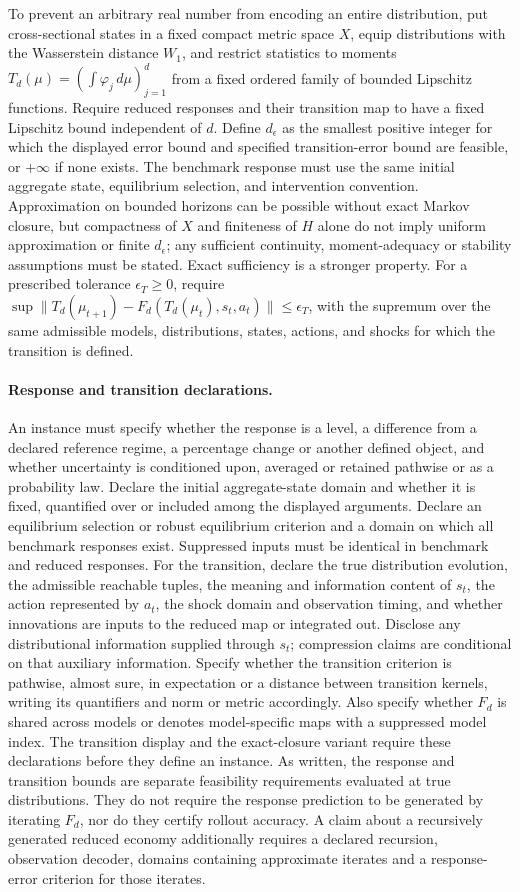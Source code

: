 \documentclass[11pt,a4paper]{article}
\begin{document}
To prevent an arbitrary real number from encoding an entire distribution, put cross-sectional states in a fixed compact metric space \(X\), equip distributions with the Wasserstein distance \(W_1\), and restrict statistics to moments \(T_d(\mu)=(\int\varphi_j\,d\mu)_{j=1}^d\) from a fixed ordered family of bounded Lipschitz functions. Require reduced responses and their transition map to have a fixed Lipschitz bound independent of \(d\). Define \(d_\epsilon\) as the smallest positive integer for which the displayed error bound and specified transition-error bound are feasible, or \(+\infty\) if none exists. The benchmark response must use the same initial aggregate state, equilibrium selection, and intervention convention. Approximation on bounded horizons can be possible without exact Markov closure, but compactness of \(X\) and finiteness of \(H\) alone do not imply uniform approximation or finite \(d_\epsilon\); any sufficient continuity, moment-adequacy or stability assumptions must be stated. Exact sufficiency is a stronger property. For a prescribed tolerance \(\epsilon_T\ge0\), require \(\sup\|T_d(\mu_{t+1})-F_d(T_d(\mu_t),s_t,a_t)\|\le\epsilon_T\), with the supremum over the same admissible models, distributions, states, actions, and shocks for which the transition is defined.
\paragraph{Response and transition declarations.} An instance must specify whether the response is a level, a difference from a declared reference regime, a percentage change or another defined object, and whether uncertainty is conditioned upon, averaged or retained pathwise or as a probability law. Declare the initial aggregate-state domain and whether it is fixed, quantified over or included among the displayed arguments. Declare an equilibrium selection or robust equilibrium criterion and a domain on which all benchmark responses exist. Suppressed inputs must be identical in benchmark and reduced responses. For the transition, declare the true distribution evolution, the admissible reachable tuples, the meaning and information content of \(s_t\), the action represented by \(a_t\), the shock domain and observation timing, and whether innovations are inputs to the reduced map or integrated out. Disclose any distributional information supplied through \(s_t\); compression claims are conditional on that auxiliary information. Specify whether the transition criterion is pathwise, almost sure, in expectation or a distance between transition kernels, writing its quantifiers and norm or metric accordingly. Also specify whether \(F_d\) is shared across models or denotes model-specific maps with a suppressed model index. The transition display and the exact-closure variant require these declarations before they define an instance. As written, the response and transition bounds are separate feasibility requirements evaluated at true distributions. They do not require the response prediction to be generated by iterating \(F_d\), nor do they certify rollout accuracy. A claim about a recursively generated reduced economy additionally requires a declared recursion, observation decoder, domains containing approximate iterates and a response-error criterion for those iterates.
\end{document}
